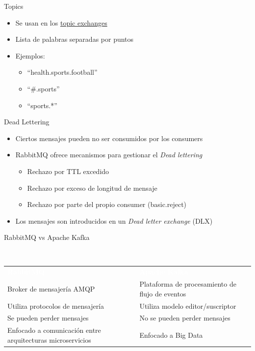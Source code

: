 \documentclass{beamer}
\begin{document}
  \begin{frame}{Topics}
    \begin{itemize}
      \item Se usan en los \underline{topic exchanges}
      \item Lista de palabras separadas por puntos
      \item Ejemplos:
      \begin{itemize}
        \item ``health.sports.football''
        \item ``\#.sports''
        \item ``sports.*''
      \end{itemize}
    \end{itemize}
  \end{frame}

  \begin{frame}{Dead Lettering}
    \begin{itemize}
      \item Ciertos mensajes pueden no ser consumidos por los consumers
      \item RabbitMQ ofrece mecanismos para gestionar el \textit{Dead lettering}
      \begin{itemize}
        \item Rechazo por TTL excedido
        \item Rechazo por exceso de longitud de mensaje
        \item Rechazo por parte del propio consumer (basic.reject)
      \end{itemize}
      \item Los mensajes son introducidos en un \textit{Dead letter exchange} (DLX)
    \end{itemize}
  \end{frame}

  \begin{frame}{RabbitMQ vs Apache Kafka}
    \begin{block}{~\vspace{0.7cm}}
      \begin{center}
      \vspace{-0.65cm}
      \begin{tabular}{p{}|p{}}
        \textcolor{white}{\bf RabbitMQ} & \textcolor{white}{\bf Apache Kafka} \\
        Broker de mensajería AMQP & Plataforma de procesamiento de flujo de eventos\\ \hline
        Utiliza protocolos de mensajería & Utiliza modelo editor/suscriptor \\ \hline
        Se pueden perder mensajes & No se pueden perder mensajes \\ \hline
        Enfocado a comunicación entre arquitecturas microservicios & Enfocado a Big Data
      \end{tabular}
      \end{center}
    \end{block}
  \end{frame}
\end{document}
